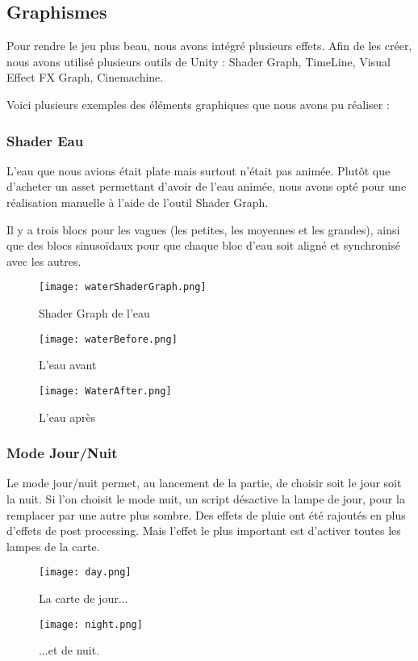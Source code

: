 \subsection{Graphismes}

Pour rendre le jeu plus beau, nous avons intégré plusieurs effets.
Afin de les créer, nous avons utilisé plusieurs outils de Unity :
Shader Graph, TimeLine, Visual Effect FX Graph, Cinemachine.

Voici plusieurs exemples des éléments graphiques que nous avons pu réaliser : 


\subsubsection{Shader Eau}

L'eau que nous avions était plate mais surtout n'était pas animée.
Plutôt que d'acheter un asset permettant d'avoir de l'eau animée,
nous avons opté pour une réalisation manuelle à l'aide de l'outil Shader Graph.

Il y a trois blocs pour les vagues (les petites, les moyennes et les grandes),
ainsi que des blocs sinusoïdaux pour que chaque bloc d'eau soit aligné et synchronisé avec les autres.
\begin{figure}[hbt!]
    \centering
    \texttt{[image: waterShaderGraph.png]}
    \caption{Shader Graph de l'eau}
\end{figure}
\begin{figure}[hbt!]
    \centering
    \texttt{[image: waterBefore.png]}
    \caption{L'eau avant}
\end{figure}
\begin{figure}[hbt!]
    \centering
    \texttt{[image: WaterAfter.png]}
    \caption{L'eau après}
\end{figure}
\FloatBarrier



\subsubsection{Mode Jour/Nuit}
Le mode jour/nuit permet, au lancement de la partie,
de choisir soit le jour soit la nuit. Si l'on choisit le mode nuit, un script désactive la lampe de jour,
 pour la remplacer par une autre plus sombre. Des effets de pluie ont été rajoutés en plus d'effets de post processing.
Mais l'effet le plus important est d'activer toutes les lampes de la carte.
\begin{figure}[hbt!]
    \centering
    \texttt{[image: day.png]}
    \caption{La carte de jour...}
\end{figure}
\begin{figure}[hbt!]
    \centering

    \texttt{[image: night.png]}
    \caption{...et de nuit.}

\end{figure}
\FloatBarrier

